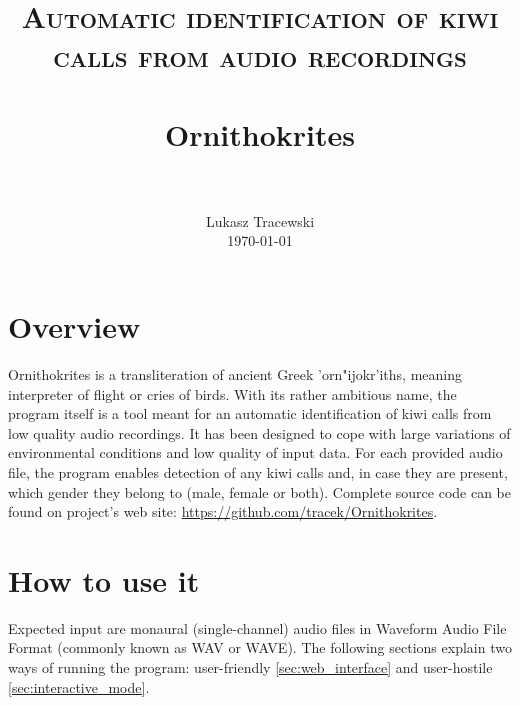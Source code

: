 \documentclass[paper=a4, fontsize=11pt]{scrartcl}	%
\title{
		\usefont{OT1}{bch}{b}{n}
		\normalfont \normalsize \textsc{Automatic identification of kiwi calls from audio recordings} \\ [25pt]
		\horrule{0.5pt} \\[0.4cm]
		\huge Ornithokrites \\
		\horrule{2pt} \\[0.5cm]
}
\author{
		\normalfont 					\normalsize
        Lukasz Tracewski\\[-3pt]		\normalsize
        \today
}
\date{}
\numberwithin{equation}{section}		%
\numberwithin{figure}{section}			%
\numberwithin{table}{section}				%
\begin{document}
\maketitle
\section{Overview}
Ornithokrites is a transliteration of ancient Greek {'orn"ijokr'iths}, meaning interpreter of flight or cries of birds. With its rather ambitious name, the program itself is a tool meant for an automatic identification of kiwi calls from low quality audio recordings. It has been designed to cope with large variations of environmental conditions and low quality of input data. For each provided audio file, the program enables detection of any kiwi calls and, in case they are present, which gender they belong to (male, female or both). \newline
Complete source code can be found on project's web site: \url{https://github.com/tracek/Ornithokrites}.

\section{How to use it}
Expected input are monaural (single-channel) audio files in Waveform Audio File Format (commonly known as WAV or WAVE). The following sections explain two ways of running the program: user-friendly \ref{sec:web_interface} and user-hostile \ref{sec:interactive_mode}.
\end{document}
